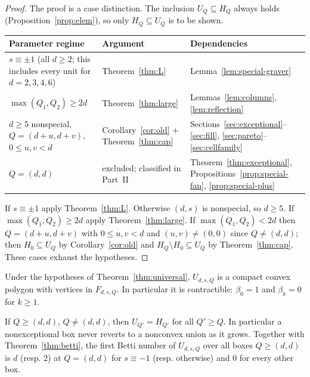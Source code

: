 \begin{proof}
The proof is a case distinction. The inclusion $U_Q\subseteq H_Q$ always holds (Proposition~\ref{prop:elem}), so only $H_Q\subseteq U_Q$ is to be shown.
\begin{center}
\small
\begin{tabular}{@{}p{5.4cm}p{4.2cm}p{4.8cm}@{}}
\toprule
Parameter regime & Argument & Dependencies\\
\midrule
$s\equiv\pm1$ (all $d\ge2$; this includes every unit for $d=2,3,4,6$) & Theorem~\ref{thm:L} & Lemma~\ref{lem:special-graver}\\
$\max(Q_1,Q_2)\ge2d$ & Theorem~\ref{thm:large} & Lemmas~\ref{lem:columns}, \ref{lem:reflection}\\
$d\ge5$ nonspecial, $Q=(d+u,d+v)$, $0\le u,v<d$ & Corollary~\ref{cor:old} + Theorem~\ref{thm:cap} & Sections~\ref{sec:exceptional}--\ref{sec:fill}, \ref{sec:pareto}--\ref{sec:cellfamily}\\
$Q=(d,d)$ & excluded; classified in Part~II & Theorem~\ref{thm:exceptional}, Propositions~\ref{prop:special-fan}, \ref{prop:special-plus}\\
\bottomrule
\end{tabular}
\end{center}
If $s\equiv\pm1$ apply Theorem~\ref{thm:L}. Otherwise $(d,s)$ is nonspecial, so $d\ge5$. If $\max(Q_1,Q_2)\ge2d$ apply Theorem~\ref{thm:large}. If $\max(Q_1,Q_2)<2d$ then $Q=(d+u,d+v)$ with $0\le u,v<d$ and $(u,v)\neq(0,0)$ since $Q\ne(d,d)$; then $H_0\subseteq U_Q$ by Corollary~\ref{cor:old} and $H_Q\setminus H_0\subseteq U_Q$ by Theorem~\ref{thm:cap}. These cases exhaust the hypotheses.
\end{proof}

\begin{corollary}\label{cor:contractible}
Under the hypotheses of Theorem~\ref{thm:universal}, $U_{d,s,Q}$ is a compact convex polygon with vertices in $F_{d,s,Q}$. In particular it is contractible: $\beta_0=1$ and $\beta_k=0$ for $k\ge1$.
\end{corollary}

\begin{corollary}\label{cor:persistence}
If $Q\ge(d,d)$, $Q\ne(d,d)$, then $U_{Q'}=H_{Q'}$ for all $Q'\ge Q$. In particular a nonexceptional box never reverts to a nonconvex union as it grows. Together with Theorem~\ref{thm:betti}, the first Betti number of $U_{d,s,Q}$ over all boxes $Q\ge(d,d)$ is $d$ (resp. $2$) at $Q=(d,d)$ for $s\equiv-1$ (resp. otherwise) and $0$ for every other box.
\end{corollary}

